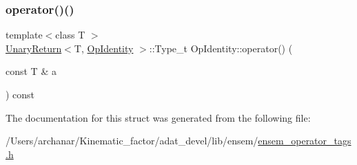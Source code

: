 \mbox{\label{structOpIdentity_a1d482adc4d4bd1a7fee1616bb11c1f71}} 
\subsubsection{\texorpdfstring{operator()()}{operator()()}\hspace{0.1cm}{\footnotesize\ttfamily [2/2]}}
{\footnotesize\ttfamily template$<$class T $>$ \\
\mbox{\hyperlink{structUnaryReturn}{Unary\+Return}}$<$T, \mbox{\hyperlink{structOpIdentity}{Op\+Identity}} $>$\+::Type\+\_\+t Op\+Identity\+::operator() (\begin{DoxyParamCaption}\item[{const T \&}]{a }\end{DoxyParamCaption}) const\hspace{0.3cm}{\ttfamily [inline]}}



The documentation for this struct was generated from the following file\+:\begin{DoxyCompactItemize}
\item 
/\+Users/archanar/\+Kinematic\+\_\+factor/adat\+\_\+devel/lib/ensem/\mbox{\hyperlink{lib_2ensem_2ensem__operator__tags_8h}{ensem\+\_\+operator\+\_\+tags.\+h}}\end{DoxyCompactItemize}
